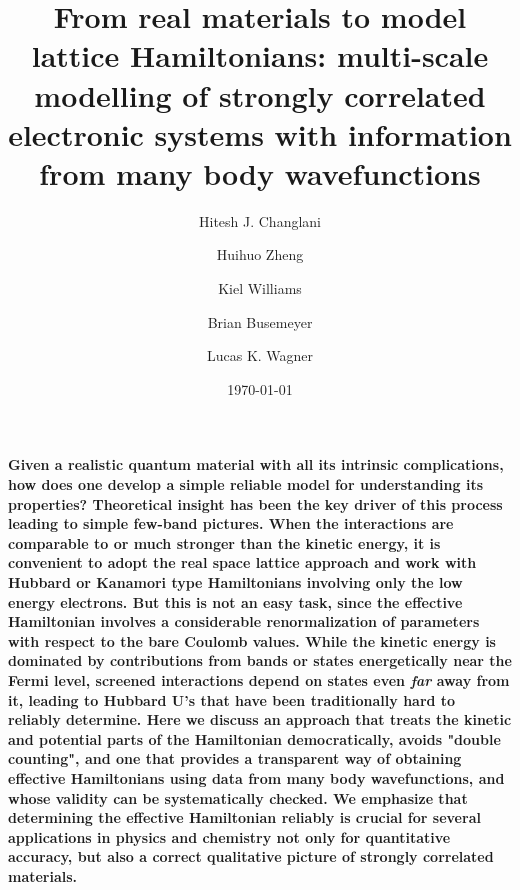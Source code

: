 \documentclass[prl,12pt,onecolumn,nofootinbib,notitlepage,english,superscriptaddress]{revtex4-1}
\begin{document}
\renewcommand{\thefootnote}{\fnsymbol{footnote}}
\renewcommand\abstractname{}
\title{From real materials to model lattice Hamiltonians: multi-scale modelling of strongly correlated electronic systems 
       with information from many body wavefunctions}

\author{Hitesh J. Changlani}
\author{Huihuo Zheng}
\author{Kiel Williams}
\author{Brian Busemeyer}
\author{Lucas K. Wagner}
\date{\today}
\maketitle

\textbf{
Given a realistic quantum material with all its intrinsic complications, how does one develop a 
simple reliable model for understanding its properties? Theoretical insight has been the key driver of 
this process leading to simple few-band pictures. When the interactions are comparable 
to or much stronger than the kinetic energy, it is convenient to adopt the real space lattice 
approach and work with Hubbard or Kanamori type Hamiltonians involving only the low energy electrons. 
But this is not an easy task, since the effective Hamiltonian involves a considerable renormalization of parameters with respect 
to the bare Coulomb values. While the kinetic energy is dominated by contributions from bands or states energetically 
near the Fermi level, screened interactions depend on states even \emph{far} away from it, leading to Hubbard U's 
that have been traditionally hard to reliably determine. 
Here we discuss an approach that treats the kinetic and potential parts of the Hamiltonian 
democratically, avoids "double counting", 
and one that provides a transparent way of obtaining effective Hamiltonians using data from many body wavefunctions, 
and whose validity can be systematically checked.
We emphasize that determining the effective Hamiltonian reliably is crucial for 
several applications in physics and chemistry not only for quantitative accuracy, but also a 
correct qualitative picture of strongly correlated materials. 
}











\end{document}
